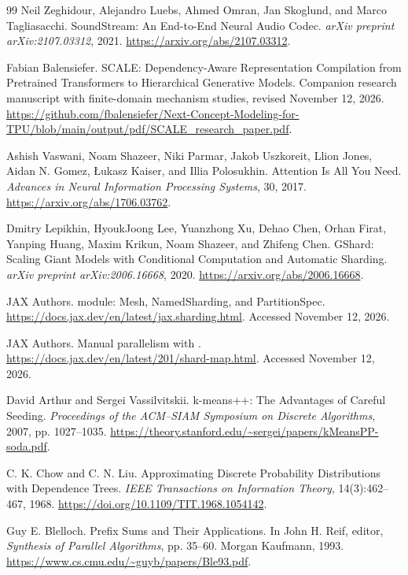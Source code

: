 \begin{thebibliography}{99}
Neil Zeghidour, Alejandro Luebs, Ahmed Omran, Jan Skoglund, and Marco
Tagliasacchi.
\newblock SoundStream: An End-to-End Neural Audio Codec.
\newblock \emph{arXiv preprint arXiv:2107.03312}, 2021.
\newblock \url{https://arxiv.org/abs/2107.03312}.

Fabian Balensiefer.
\newblock SCALE: Dependency-Aware Representation Compilation from Pretrained Transformers to Hierarchical Generative Models.
\newblock Companion research manuscript with finite-domain mechanism studies, revised November 12, 2026.
\newblock \url{https://github.com/fbalensiefer/Next-Concept-Modeling-for-TPU/blob/main/output/pdf/SCALE_research_paper.pdf}.

Ashish Vaswani, Noam Shazeer, Niki Parmar, Jakob Uszkoreit, Llion Jones,
Aidan N. Gomez, \L{}ukasz Kaiser, and Illia Polosukhin.
\newblock Attention Is All You Need.
\newblock \emph{Advances in Neural Information Processing Systems}, 30, 2017.
\newblock \url{https://arxiv.org/abs/1706.03762}.

Dmitry Lepikhin, HyoukJoong Lee, Yuanzhong Xu, Dehao Chen, Orhan Firat,
Yanping Huang, Maxim Krikun, Noam Shazeer, and Zhifeng Chen.
\newblock GShard: Scaling Giant Models with Conditional Computation and
Automatic Sharding.
\newblock \emph{arXiv preprint arXiv:2006.16668}, 2020.
\newblock \url{https://arxiv.org/abs/2006.16668}.

JAX Authors.
\newblock {} module: Mesh, NamedSharding, and PartitionSpec.
\newblock \url{https://docs.jax.dev/en/latest/jax.sharding.html}.
Accessed November 12, 2026.

JAX Authors.
\newblock Manual parallelism with .
\newblock \url{https://docs.jax.dev/en/latest/201/shard-map.html}.
Accessed November 12, 2026.

David Arthur and Sergei Vassilvitskii.
\newblock k-means++: The Advantages of Careful Seeding.
\newblock \emph{Proceedings of the ACM--SIAM Symposium on Discrete Algorithms}, 2007, pp. 1027--1035.
\newblock \url{https://theory.stanford.edu/~sergei/papers/kMeansPP-soda.pdf}.

C. K. Chow and C. N. Liu.
\newblock Approximating Discrete Probability Distributions with Dependence Trees.
\newblock \emph{IEEE Transactions on Information Theory}, 14(3):462--467, 1968.
\newblock \url{https://doi.org/10.1109/TIT.1968.1054142}.

Guy E. Blelloch.
\newblock Prefix Sums and Their Applications.
\newblock In John H. Reif, editor, \emph{Synthesis of Parallel Algorithms}, pp. 35--60.
Morgan Kaufmann, 1993.
\newblock \url{https://www.cs.cmu.edu/~guyb/papers/Ble93.pdf}.
\end{thebibliography}
\endgroup
